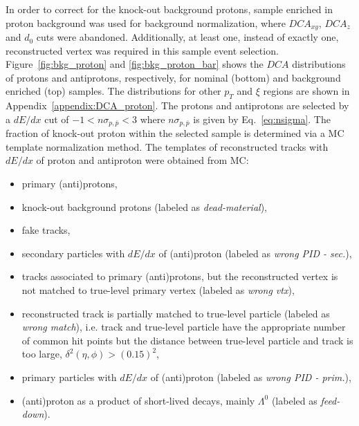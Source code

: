 In order to correct for the knock-out background protons, sample enriched in proton background  was used for background normalization, where $DCA_{xy}$, $DCA_z$ and $d_0$ cuts were abandoned. Additionally, at least one, instead of exactly one,  reconstructed vertex was required in this sample event selection.  Figure~\ref{fig:bkg_proton} and \ref{fig:bkg_proton_bar} shows the $DCA$ distributions of protons and antiprotons, respectively, for  nominal (bottom) and background enriched (top) samples. The distributions for other $p_T$ and $\xi$ regions are shown in Appendix~\ref{appendix:DCA_proton}. The protons and antiprotons are selected by a $dE/dx$ cut of $-1 < n\sigma_{p,\bar{p}} < 3$ where $n\sigma_{p,\bar{p}}$ is given by Eq.~\ref{eq:nsigma}.  The fraction of knock-out proton within the selected sample is determined via a MC template normalization method. The templates of reconstructed tracks with $dE/dx$ of proton and antiproton were obtained from MC:
\begin{itemize}
	\item primary (anti)protons,
	\item knock-out background protons (labeled as \textit{dead-material}),
	\item fake tracks,
	\item secondary particles with $dE/dx$ of (anti)proton (labeled as \textit{wrong PID - sec.}),
	\item tracks associated to primary (anti)protons, but the reconstructed vertex is not matched to true-level primary vertex (labeled as \textit{wrong vtx}),
	\item reconstructed track is partially matched to true-level particle (labeled as \textit{wrong match}), i.e.  track and true-level particle have the appropriate number of common hit points but the distance between true-level particle and track is too large, $\delta^2\left(\eta,\phi\right)>\left(0.15\right)^2$,
	\item primary particles with $dE/dx$ of (anti)proton (labeled as \textit{wrong PID - prim.}),
	\item (anti)proton as a product of short-lived decays, mainly $\Lambda^0$ (labeled as \textit{feed-down}).
\end{itemize}

